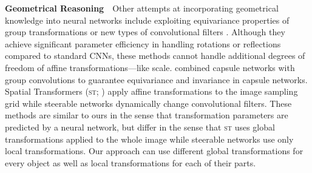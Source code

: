 \textbf{Geometrical Reasoning}\ \ 
Other attempts at incorporating geometrical knowledge into neural networks include exploiting equivariance properties of group transformations \citep{Cohen2016group} or new types of convolutional filters \citep{Mallat,Kocvok}.
Although they achieve significant parameter efficiency in handling rotations or reflections compared to standard \glspl{CNN}, these methods cannot handle additional degrees of freedom of affine transformations---like scale. \cite{Lenssen} combined capsule networks with group convolutions to  guarantee equivariance and invariance in capsule networks.
Spatial Transformers (\textsc{st}; \cite{Jaderberg2015}) apply affine transformations to the image sampling grid while steerable networks \citep{Cohen2016steerable,Jacobsen2017dynamic} dynamically change convolutional filters.
These methods are similar to ours in the sense that transformation parameters are predicted by a neural network, but differ in the sense that \textsc{st} uses global transformations applied to the whole image while steerable networks use only local transformations.
Our approach can use different global transformations for every object as well as local transformations for each of their parts.




